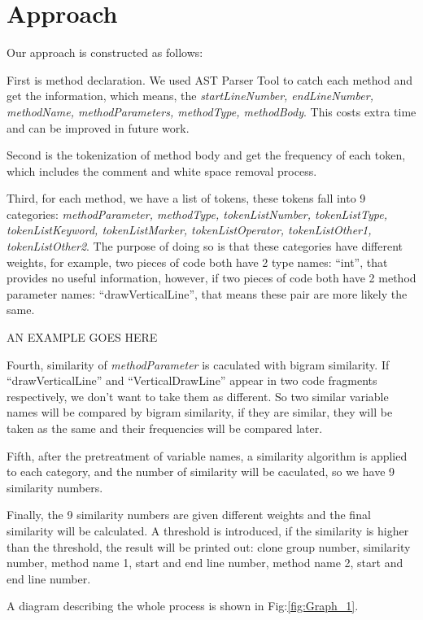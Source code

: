 \documentclass[../main.tex]{subfiles}
\begin{document}
\section{Approach}

Our approach is constructed as follows:

First is method declaration. We used AST Parser Tool to catch each method and get the information, which means, the \textit{startLineNumber, endLineNumber, methodName, methodParameters, methodType, methodBody}. This costs extra time and can be improved in future work.

Second is the tokenization of method body and get the frequency of each token, which includes the comment and white space removal process.

Third, for each method, we have a list of tokens, these tokens fall into 9 categories: \textit{methodParameter, methodType, tokenListNumber, tokenListType, tokenListKeyword, tokenListMarker, tokenListOperator, tokenListOther1, tokenListOther2}. The purpose of doing so is that these categories have different weights, for example, two pieces of code both have 2 type names: ``int'', that provides no useful information, however, if two pieces of code both have 2 method parameter names: ``drawVerticalLine'', that means these pair are more likely the same.

AN EXAMPLE GOES HERE

Fourth, similarity of \textit{methodParameter} is caculated with bigram similarity. If ``drawVerticalLine'' and ``VerticalDrawLine'' appear in two code fragments respectively, we don't want to take them as different. So two similar variable names will be compared by bigram similarity, if they are similar, they will be taken as the same and their frequencies will be compared later.

Fifth, after the pretreatment of variable names, a similarity algorithm is applied to each category, and the number of similarity will be caculated, so we have 9 similarity numbers.

Finally, the 9 similarity numbers are given different weights and the final similarity will be calculated. A threshold is introduced, if the similarity is higher than the threshold, the result will be printed out: clone group number, similarity number, method name 1, start and end line number, method name 2, start and end line number.

A diagram describing the whole process is shown in Fig:\ref{fig:Graph_1}.\\
\end{document}
